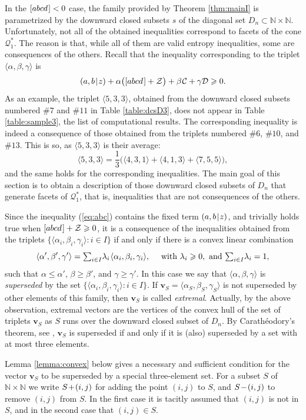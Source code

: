 \documentclass[reqno]{amsart}
\theoremstyle{definition}
\newcommand\tsp{\mkern 1.5mu}
\def\|{\mkern1.5mu{|}\mkern1.5mu}
\renewcommand\ge{\geqslant}\renewcommand\le{\leqslant}
\newcommand\C{\mathcal C}
\newcommand\D{\mathcal D}
\newcommand\Z{\mathcal Z} %
\newcommand\N{\mathbb N}  %
\def\<{\langle}\def\>{\rangle}
\newcommand\tsum{{\textstyle\sum}}
\def\m#1{\tsp{#1}\tsp}
\def\abcd{[abcd\tsp]}
\begin{document}
In the $\abcd<0$ case, the family provided by Theorem \ref{thm:mainI} is
parametrized by the downward closed subsets $s$ of the diagonal set
$D_n\subset \N\times\N$. Unfortunately, not all of the obtained inequalities
correspond to facets of the cone $\mathcal Q^*_1$. The reason is that, while
all of them are valid entropy inequalities, some are consequences of the
others. Recall that the inequality corresponding to the triplet
$\<\alpha,\beta,\gamma\>$ is
\begin{equation}\label{eq:abc}
    (a,b\|z)+\alpha\big(\abcd + \Z\big) +\beta\tsp\C+\gamma\D \ge 0.
\end{equation}
As an example, the triplet $\<5,3,3\>$, obtained from the downward closed
subsets numbered $\#7$ and $\#11$ in Table \ref{table:dcsD3}, does not
appear in Table \ref{table:sample3}, the list of computational results. The
corresponding inequality is indeed a consequence of those obtained from the
triplets numbered $\#6$, $\#10$, and $\#13$. This is so, as $\<5,3,3\>$ is
their average:
$$
  \<5,3,3\> = \frac13\big(\<4,3,1\>+\<4,1,3\>+\<7,5,5\>\big),
$$
and the same holds for the corresponding inequalities. The main goal of this
section is to obtain a description of those downward closed subsets of $D_n$
that generate facets of $\mathcal Q^*_1$, that is, inequalities that are not
consequences of the others.

Since the inequality (\ref{eq:abc}) contains the fixed term $(a,b\|z)$, and
trivially holds true when $\abcd+\Z\ge 0$, it is a consequence of the
inequalities obtained from the triplets $\{\<\alpha_i,\beta_i,\gamma_i\>:
i\in I\}$ if and only if there is a convex linear combination
$$
    \<\alpha',\beta',\gamma'\>=\tsum_{i\in I} \lambda_i\tsp
    \<\alpha_i,\beta_i,\gamma_i\>,
    ~~~\mbox{ with } \lambda_i\ge 0, \mbox{ and } \tsum_{i\in I}\lambda_i=1,
$$
such that $\alpha\le\alpha'$, $\beta\ge\beta'$, and $\gamma \ge\gamma'$. In
this case we say that $\<\alpha,\beta,\gamma\>$ is \emph{superseded} by the
set $\{\<\alpha_i,\beta_i,\gamma_i\>:i\in I\}$. If $\mathbf v_S=\<\alpha_S,
\beta_S,\gamma_S\>$ is not superseded by other elements of this family, then
$\mathbf v_S$ is called \emph{extremal}. Actually, by the above observation,
extremal vectors are the vertices of the convex hull of the set of triplets
$\mathbf v_S$ as $S$ runs over the downward closed subset of $D_n$. By
Carath\'eodory's theorem, see \cite{ziegler}, $\mathbf v_S$ is superseded if
and only if it is (also) superseded by a set with at most three elements.

Lemma \ref{lemma:convex} below gives a necessary and sufficient condition
for the vector $\mathbf
v_S$ to be superseded by a special three-element set. For a subset $S$ of
$\N\times\N$ we write $S\m+(i,j)$ for adding the point $(i,j)$ to $S$, and
$S\m-(i,j)$ to remove $(i,j)$ from $S$. In the first case it is tacitly
assumed that $(i,j)$ is not in $S$, and in the second case that $(i,j)\in
S$.
\end{document}
